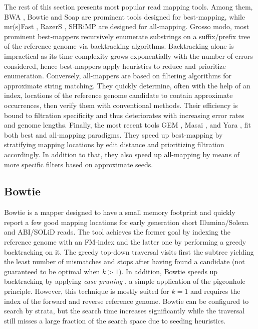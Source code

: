 The rest of this section presents most popular read mapping tools.
Among them, BWA \citep{Li2009,Li2010a}, Bowtie \citep{Langmead2009,Langmead2012} and Soap \citep{Li2009b} are prominent tools designed for best-mapping, while mr(s)Fast \citep{Alkan2009,Hach2010}, RazerS \citep{Weese2009,Weese2012}, SHRiMP \citep{Rumble2009,David2011} are designed for all-mapping.
Grosso modo, most prominent best-mappers recursively enumerate substrings on a suffix/prefix tree of the reference genome via backtracking algorithms.
Backtracking alone is impractical as its time complexity grows exponentially with the number of errors considered, hence best-mappers apply heuristics to reduce and prioritize enumeration.
Conversely, all-mappers are based on filtering algorithms for approximate string matching.
They quickly determine, often with the help of an index, locations of the reference genome candidate to contain approximate occurrences, then verify them with conventional methods.
Their efficiency is bound to filtration specificity and thus deteriorates with increasing error rates and genome lengths.
Finally, the most recent tools GEM \citep{MarcoSola2012}, Masai \citep{Siragusa2013}, and Yara \citep{Siragusa2014}, fit both best and all-mapping paradigms.
They speed up best-mapping by stratifying mapping locations by edit distance and prioritizing filtration accordingly.
In addition to that, they also speed up all-mapping by means of more specific filters based on approximate seeds.



\subsection{Bowtie}
\label{background:mappers:bowtie}

Bowtie \citep{Langmead2009} is a mapper designed to have a small memory footprint and quickly report a few good mapping locations for early generation short Illumina/Solexa and ABI/SOLiD reads.
The tool achieves the former goal by indexing the reference genome with an FM-index and the latter one by performing a greedy backtracking on it.
The greedy top-down traversal visits first the subtree yielding the least number of mismatches and stops after having found a candidate (not guaranteed to be optimal when $k>1$).
In addition, Bowtie speeds up backtracking by applying \emph{case pruning} \citep{Maekinen2010}, a simple application of the pigeonhole principle.
However, this technique is mostly suited for $k=1$ and requires the index of the forward and reverse reference genome.
Bowtie can be configured to search by strata, but the search time increases significantly while the traversal still misses a large fraction of the search space due to seeding heuristics.

